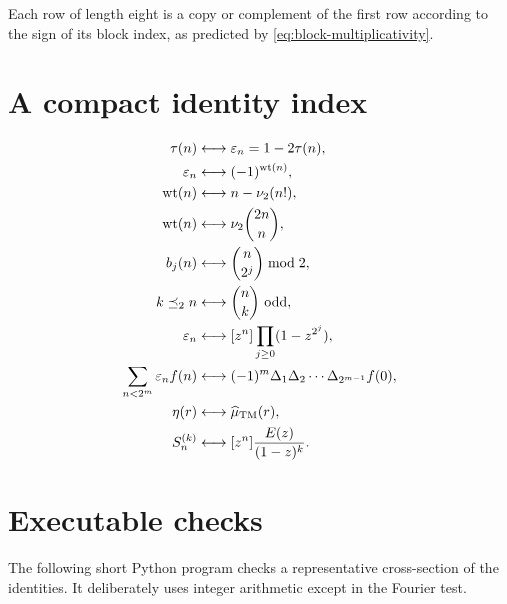 \documentclass[11pt,oneside]{article}
\numberwithin{equation}{section}
\theoremstyle{definition}
\theoremstyle{remark}
\newcommand{\wt}{\operatorname{wt}}
\newcommand{\vtwo}{\nu_2}
\newcommand{\eps}{\varepsilon}
\newcommand{\TM}{\tau}
\newcommand{\submask}{\preceq_2}
\begin{document}
Each row of length eight is a copy or complement of the first row according
to the sign of its block index, as predicted by
\eqref{eq:block-multiplicativity}.

\section{A compact identity index}
\label{app:index}

\begin{align*}
 \TM(n)&\longleftrightarrow \eps_n=1-2\TM(n),\\
 \eps_n&\longleftrightarrow(-1)^{\wt(n)},\\
 \wt(n)&\longleftrightarrow n-\vtwo(n!),\\
 \wt(n)&\longleftrightarrow\vtwo\binom{2n}{n},\\
 b_j(n)&\longleftrightarrow\binom{n}{2^j}\bmod2,\\
 k\submask n&\longleftrightarrow\binom nk\text{ odd},\\
 \eps_n&\longleftrightarrow[z^n]\prod_{j\ge0}(1-z^{2^j}),\\
 \sum_{n<2^m}\eps_nf(n)
 &\longleftrightarrow(-1)^m\Delta_1\Delta_2\cdots
 \Delta_{2^{m-1}}f(0),\\
 \eta(r)&\longleftrightarrow\widehat\mu_{\rm TM}(r),\\
 S_n^{(k)}&\longleftrightarrow[z^n]\frac{E(z)}{(1-z)^k}.
\end{align*}

\section{Executable checks}
\label{app:code}

The following short Python program checks a representative cross-section of
the identities.  It deliberately uses integer arithmetic except in the
Fourier test.
\end{document}
